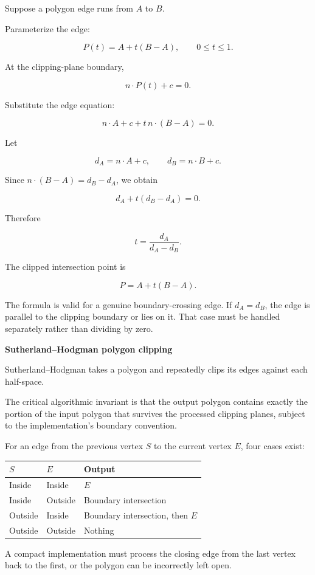 Suppose a polygon edge runs from \(A\) to \(B\).

Parameterize the edge:

\[
P(t)=A+t(B-A),\qquad 0\le t\le1.
\]

At the clipping-plane boundary,

\[
n\cdot P(t)+c=0.
\]

Substitute the edge equation:

\[
n\cdot A+c+t\,n\cdot(B-A)=0.
\]

Let

\[
d_A=n\cdot A+c,\qquad d_B=n\cdot B+c.
\]

Since \(n\cdot(B-A)=d_B-d_A\), we obtain

\[
d_A+t(d_B-d_A)=0.
\]

Therefore

\[
\boxed{t=\frac{d_A}{d_A-d_B}}.
\]

The clipped intersection point is

\[
P=A+t(B-A).
\]

The formula is valid for a genuine boundary-crossing edge. If \(d_A=d_B\), the edge is parallel to the clipping boundary or lies on it. That case must be handled separately rather than dividing by zero.

\textbf{Sutherland--Hodgman polygon clipping}

Sutherland--Hodgman takes a polygon and repeatedly clips its edges against each half-space.

The critical algorithmic invariant is that the output polygon contains exactly the portion of the input polygon that survives the processed clipping planes, subject to the implementation's boundary convention.

For an edge from the previous vertex \(S\) to the current vertex \(E\), four cases exist:

{\def\LTcaptype{none} %
\begin{longtable}[]{@{}lll@{}}
\toprule\noalign{}
\(S\) & \(E\) & Output \\
\midrule\noalign{}
\endhead
\bottomrule\noalign{}
\endlastfoot
Inside & Inside & \(E\) \\
Inside & Outside & Boundary intersection \\
Outside & Inside & Boundary intersection, then \(E\) \\
Outside & Outside & Nothing \\
\end{longtable}
}

A compact implementation must process the closing edge from the last vertex back to the first, or the polygon can be incorrectly left open.

